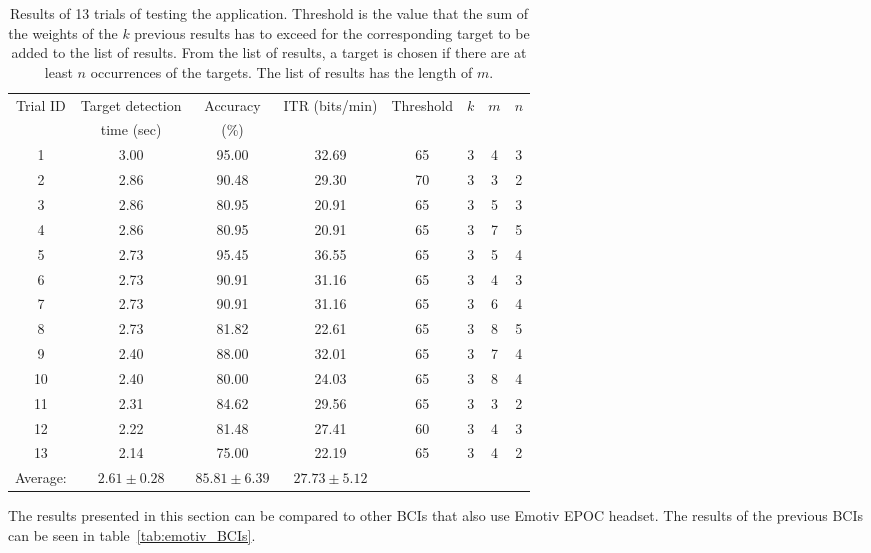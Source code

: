 \begin{table}[h]
	\centering
	\begin{tabular}{|c|c|c|c|c|c|c|c|}\hline
Trial ID	& Target detection 	& Accuracy	& ITR (bits/min)	& Threshold&$k$ & $m$& $n$\\
			& time (sec)		& (\%)		&					&   &  &  & \\\hline
1			& 3.00				& 95.00		& 32.69				& 65& 3& 4& 3\\\hline
2			& 2.86				& 90.48		& 29.30				& 70& 3& 3& 2\\\hline
3			& 2.86				& 80.95		& 20.91				& 65& 3& 5& 3\\\hline
4			& 2.86				& 80.95		& 20.91				& 65& 3& 7& 5\\\hline
5			& 2.73				& 95.45 	& 36.55				& 65& 3& 5& 4\\\hline
6			& 2.73				& 90.91		& 31.16				& 65& 3& 4& 3\\\hline
7			& 2.73				& 90.91		& 31.16				& 65& 3& 6& 4\\\hline
8 			& 2.73	 			& 81.82 	& 22.61 			& 65& 3& 8& 5\\\hline
9 			& 2.40 				& 88.00 	& 32.01 			& 65& 3& 7& 4\\\hline
10 			& 2.40 				& 80.00 	& 24.03 			& 65& 3& 8& 4\\\hline
11 			& 2.31				& 84.62 	& 29.56 			& 65& 3& 3& 2\\\hline
12 			& 2.22 				& 81.48 	& 27.41 			& 60& 3& 4& 3\\\hline
13 			& 2.14 				& 75.00		& 22.19 			& 65& 3& 4& 2\\\hline
Average:	& $2.61\pm 0.28$ 	& $85.81\pm 6.39$	& $27.73\pm 5.12$\\\cline{1-4}
	\end{tabular}
	\caption{Results of 13 trials of testing the application. Threshold is the value that the sum of the weights of the $k$ previous results has to exceed for the corresponding target to be added to the list of results. From the list of results, a target is chosen if there are at least $n$ occurrences of the targets. The list of results has the length of $m$.}
	\label{tab:results}
\end{table}

The results presented in this section can be compared to other \glspl{BCI} that also use Emotiv EPOC headset. The results of the previous \glspl{BCI} can be seen in table~\ref{tab:emotiv_BCIs}.

